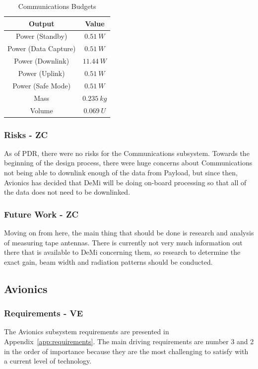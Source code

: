 \documentclass[12pt]{article}
\begin{document}
\begin{table}[ht]
\caption{Communications Budgets}
\label{table:comm_summary_outputs}
\begin{center}
    \begin{tabular}{|c||c|} \hline
    	Output & Value \\ \hline \hline
    Power (Standby) & $0.51\ W$  \\
    Power (Data Capture) & $0.51\ W$ \\
    Power (Downlink) & $11.44\ W$ \\
    Power (Uplink) & $0.51\ W$ \\
    Power (Safe Mode) & $0.51\ W$ \\
    Mass & $0.235\ kg$  \\
    Volume & $0.069\ U$ \\ \hline 
    \end{tabular}
\end{center}
\end{table}

			\subsubsection{Risks - ZC}

As of PDR, there were no risks for the Communications subsystem. Towards the beginning of the design process, there were huge concerns about Communications not being able to downlink enough of the data from Payload, but since then, Avionics has decided that DeMi will be doing on-board processing so that all of the data does not need to be downlinked.

			\subsubsection{Future Work - ZC}

Moving on from here, the main thing that should be done is research and analysis of measuring tape antennas. There is currently not very much information out there that is available to DeMi concerning them, so research to determine the exact gain, beam width and radiation patterns should be conducted.		
		
		\subsection{Avionics}
			\subsubsection{Requirements - VE}
The Avionics subsystem requirements are presented in Appendix~\ref{app:requirements}.  The main driving requirements are number 3 and 2 in the order of importance because they are the most challenging to satisfy with a current level of technology.
\end{document}
